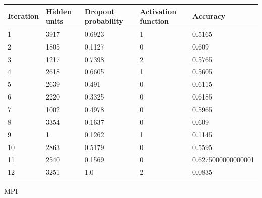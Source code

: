 \documentclass[12pt,fleqn]{article}
\begin{document}
\begin{table}[H]
	\begin{tabular}{|l|l|l|l|l|}
		\hline
		Iteration & Hidden units & Dropout probability & Activation function & Accuracy \\ \hline
		1 & 3917 & 0.6923 & 1 & 0.5165 \\ \hline 

		2 & 1805 & 0.1127 & 0 & 0.609 \\ \hline 

		3 & 1217 & 0.7398 & 2 & 0.5765 \\ \hline 

		4 & 2618 & 0.6605 & 1 & 0.5605 \\ \hline 

		5 & 2639 & 0.491 & 0 & 0.6115 \\ \hline 

		6 & 2220 & 0.3325 & 0 & 0.6185 \\ \hline 

		7 & 1002 & 0.4978 & 0 & 0.5965 \\ \hline 

		8 & 3354 & 0.1637 & 0 & 0.609 \\ \hline 

		9 & 1 & 0.1262 & 1 & 0.1145 \\ \hline 

		10 & 2863 & 0.5179 & 0 & 0.5595 \\ \hline 

		11 & 2540 & 0.1569 & 0 & 0.6275000000000001 \\ \hline 

		12 & 3251 & 1.0 & 2 & 0.0835 \\ \hline 

	\end{tabular}
\end{table}
MPI
\end{document}
